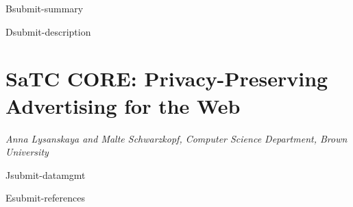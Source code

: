\documentclass[11pt]{article}
\newcommand{\proptitle}{Privacy-Preserving Advertising for the Web}
\newcommand{\authoraffil}{Anna Lysanskaya and Malte Schwarzkopf, Computer Science Department, Brown University}
\begin{document}
\pagestyle{plain}

\begin{submit}{B}{submit-summary}

\end{submit}


\begin{submit}{D}{submit-description}

\section*{SaTC CORE: \proptitle{}}
{\em\authoraffil}
\medskip


%
%
%
%
%


\end{submit}

%

\begin{submit}{J}{submit-datamgmt}

\end{submit}

%

%

%

\begin{submit}{E}{submit-references}
{

\renewcommand{\refname}{{E}\quad References Cited}
\raggedright
%
%
\printbibliography

}
\end{submit}
\end{document}
